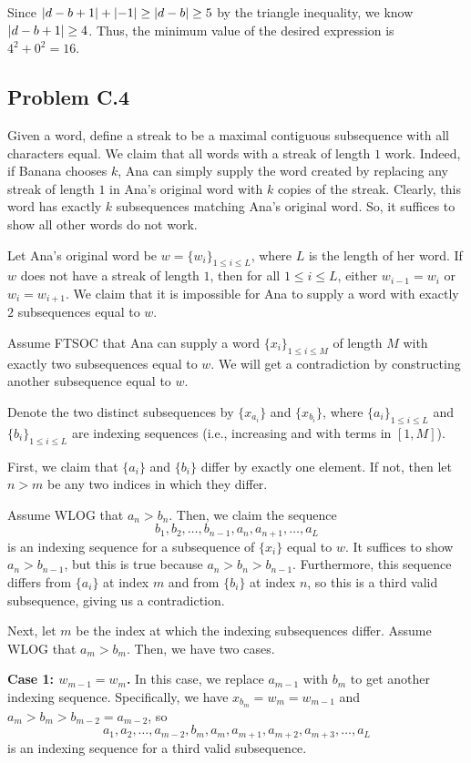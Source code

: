 \documentclass{scrartcl}
\begin{document}
Since $\left\lvert d-b+1 \right\rvert + \left\lvert -1 \right\rvert \geq \left\lvert d-b \right\rvert \geq 5$ by the triangle inequality, we know $\left\lvert d-b+1 \right\rvert \geq 4$.
Thus, the minimum value of the desired expression is $4^2 + 0^2 = 16$.

\subsection*{Problem C.4}
Given a word, define a streak to be a maximal contiguous subsequence with all characters equal.
We claim that all words with a streak of length $1$ work.
Indeed, if Banana chooses $k$, Ana can simply supply the word created by replacing any streak of length $1$ in Ana's original word with $k$ copies of the streak.
Clearly, this word has exactly $k$ subsequences matching Ana's original word.
So, it suffices to show all other words do not work.

Let Ana's original word be $w = \{w_i\}_{1 \leq i \leq L}$, where $L$ is the length of her word.
If $w$ does not have a streak of length $1$, then for all $1 \leq i \leq L$, either $w_{i-1} = w_i$ or $w_i = w_{i+1}$.
We claim that it is impossible for Ana to supply a word with exactly $2$ subsequences equal to $w$.

Assume FTSOC that Ana can supply a word $\{x_i\}_{1 \leq i \leq M}$ of length $M$ with exactly two subsequences equal to $w$.
We will get a contradiction by constructing another subsequence equal to $w$.

Denote the two distinct subsequences by $\{x_{a_i}\}$ and $\{x_{b_i}\}$, where $\{a_i\}_{1 \leq i \leq L}$ and $\{b_i\}_{1 \leq i \leq L}$ are indexing sequences (i.e., increasing and with terms in $[1,M]$).

First, we claim that $\{a_i\}$ and $\{b_i\}$ differ by exactly one element.
If not, then let $n > m$ be any two indices in which they differ.

Assume WLOG that $a_n > b_n$.
Then, we claim the sequence
\[ b_1, b_2, \dots, b_{n-1}, a_n, a_{n+1}, \dots, a_L \]
is an indexing sequence for a subsequence of $\{x_i\}$ equal to $w$.
It suffices to show $a_n > b_{n-1}$, but this is true because $a_n > b_n > b_{n-1}$.
Furthermore, this sequence differs from $\{a_i\}$ at index $m$ and from $\{b_i\}$ at index $n$, so this is a third valid subsequence, giving us a contradiction.

Next, let $m$ be the index at which the indexing subsequences differ.
Assume WLOG that $a_m > b_m$.
Then, we have two cases.

\textbf{Case 1: $w_{m-1} = w_m$.} In this case, we replace $a_{m-1}$ with $b_m$ to get another indexing sequence.
Specifically, we have $x_{b_m} = w_m = w_{m-1}$ and $a_m > b_m > b_{m-2} = a_{m-2}$, so
\[ a_1, a_2, \dots, a_{m-2}, b_m, a_m, a_{m+1}, a_{m+2}, a_{m+3}, \dots, a_L \]
is an indexing sequence for a third valid subsequence.
\end{document}
